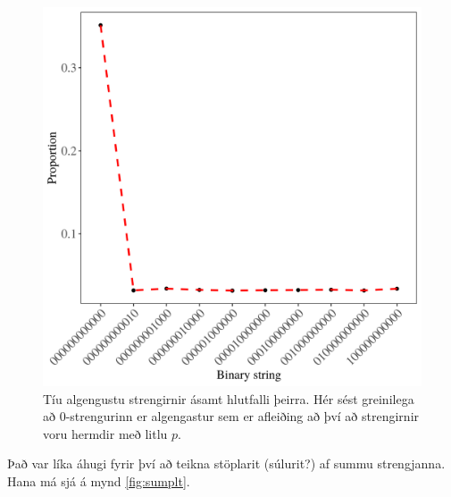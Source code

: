 \documentclass[10pt,]{article}
\begin{document}
\begin{figure}[H]

{\centering \includegraphics[width=1\linewidth]{img/prop_plt} 

}

\caption{Tíu algengustu strengirnir ásamt hlutfalli þeirra. Hér sést greinilega að 0-strengurinn er algengastur sem er afleiðing að því að strengirnir voru hermdir með litlu $p$.}\label{fig:stringplt}
\end{figure}

Það var líka áhugi fyrir því að teikna stöplarit (súlurit?) af summu strengjanna. Hana má sjá á mynd \ref{fig:sumplt}.
\end{document}
